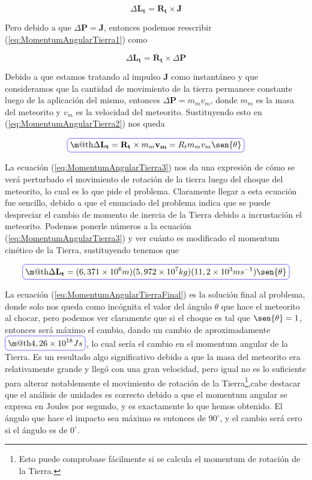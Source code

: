 \documentclass[a4paper,10pt]{article}
\makeatletter
\numberwithin{equation}{section}
\newcommand*{\boxcolor}{blue}
\renewcommand{\boxed}[1]{\textcolor{\boxcolor}{%
\tikz[baseline={([yshift=-1ex]current bounding box.center)}] \node [rectangle, minimum width=1ex,rounded corners,draw] {\normalcolor\m@th$\displaystyle#1$};}}
\makeatother
\begin{document}
\begin{equation}
 \Delta \mathbf{L_t} = \mathbf{R_t} \times \mathbf{J}
 \label{eq:MomentumAngularTierra1}
\end{equation}

Pero debido a que $\Delta \mathbf{P} = \mathbf{J}$, entonces podemos reescribir 
(\ref{eq:MomentumAngularTierra1}) como

\begin{equation}
 \Delta \mathbf{L_t} = \mathbf{R_t} \times \Delta \mathbf{P}
 \label{eq:MomentumAngularTierra2} 
\end{equation}

Debido a que estamos tratando al impulso $\mathbf{J}$ como instantáneo y que consideramos
que la cantidad de movimiento de la tierra permanece constante luego de la aplicación
del mismo, entonces $\Delta \mathbf{P} = m_m v_m$, donde $m_m$ es la masa del meteorito
y $v_m$ es la velocidad del meteorito. Sustituyendo esto en (\ref{eq:MomentumAngularTierra2})
nos queda

\begin{equation}
 \boxed{\Delta \mathbf{L_t} = \mathbf{R_t} \times m_m \mathbf{v_m} = R_t m_m v_m \sen{\theta}}
 \label{eq:MomentumAngularTierra3}
\end{equation}

La ecuación (\ref{eq:MomentumAngularTierra3}) nos da una expresión de cómo se verá
perturbado el movimiento de rotación de la tierra luego del choque del meteorito, lo cual
es lo que pide el problema. Claramente llegar a esta ecuación fue sencillo, debido a que
el enunciado del problema indica que se puede despreciar el cambio de momento de inercia
de la Tierra debido a incrustación el meteorito. Podemos ponerle números a la ecuación
(\ref{eq:MomentumAngularTierra3}) y ver cuánto es modificado el momentum cinético de la 
Tierra, sustituyendo tenemos que

\begin{equation}
 \boxed{\Delta \mathbf{L_t} = (6,371 \times 10^{6} m) (5,972 \times 10^7 kg) (11,2 \times 10^{3} m s^{-1}) \sen{\theta}}
 \label{eq:MomentumAngularTierraFinal}
\end{equation}

La ecuación (\ref{eq:MomentumAngularTierraFinal}) es la solución final al problema,
donde solo nos queda como incógnita el valor del ángulo $\theta$ que hace el meteorito
al chocar, pero podemos ver claramente que si el choque es tal que $\sen{\theta} = 1$, entonces
será máximo el cambio, dando un cambio de aproximadamente $\boxed{4,26 \times 10^{18} Js}$, lo cual
sería el cambio en el momentum angular de la Tierra. Es un resultado algo significativo
debido a que la masa del meteorito era relativamente grande y llegó con una gran velocidad,
pero igual no es lo suficiente para alterar notablemente el movimiento de rotación de la 
Tierra\footnote{Esto puede comprobase fácilmente si se calcula el momentum de rotación de 
la Tierra.},cabe destacar que el análisis de unidades es correcto debido a que el momentum angular
se expresa en Joules por segundo, y es exactamente lo que hemos obtenido. El ángulo
que hace el impacto sea máximo es entonces de $90^\circ$, y el cambio será cero si 
el ángulo es de $0^\circ$.
\end{document}
